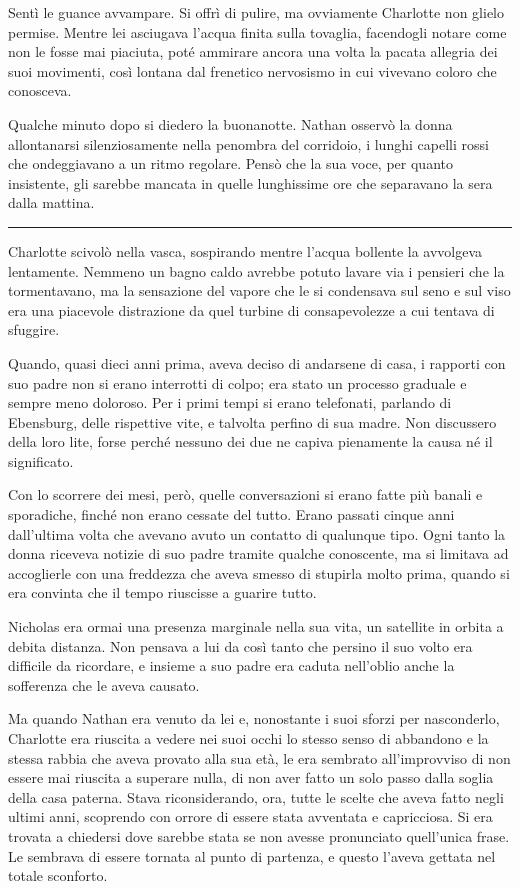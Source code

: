 \documentclass[a4paper,oneside,9pt]{memoir}
\begin{document}
Sentì le guance avvampare. Si offrì di pulire, ma ovviamente Charlotte non glielo permise. Mentre lei asciugava
l'acqua finita sulla tovaglia, facendogli notare come non le fosse mai piaciuta, poté ammirare ancora una volta la
pacata allegria dei suoi movimenti, così lontana dal frenetico nervosismo in cui vivevano coloro che conosceva.

Qualche minuto dopo si diedero la buonanotte. Nathan osservò la donna allontanarsi silenziosamente nella penombra del
corridoio, i lunghi capelli rossi che ondeggiavano a un ritmo regolare. Pensò che la sua voce, per quanto insistente,
gli sarebbe mancata in quelle lunghissime ore che separavano la sera dalla mattina.

\plainbreak{1}

Charlotte scivolò nella vasca, sospirando mentre l'acqua bollente la avvolgeva lentamente. Nemmeno un bagno caldo
avrebbe potuto lavare via i pensieri che la tormentavano, ma la sensazione del vapore che le si condensava sul seno e
sul viso era una piacevole distrazione da quel turbine di consapevolezze a cui tentava di sfuggire.

Quando, quasi dieci anni prima, aveva deciso di andarsene di casa, i rapporti con suo padre non si erano interrotti di
colpo; era stato un processo graduale e sempre meno doloroso. Per i primi tempi si erano telefonati, parlando di
Ebensburg, delle rispettive vite, e talvolta perfino di sua madre. Non discussero della loro lite, forse perché nessuno
dei due ne capiva pienamente la causa né il significato.

Con lo scorrere dei mesi, però, quelle conversazioni si erano fatte più banali e sporadiche, finché non erano cessate
del tutto. Erano passati cinque anni dall'ultima volta che avevano avuto un contatto di qualunque tipo. Ogni tanto la
donna riceveva notizie di suo padre tramite qualche conoscente, ma si limitava ad accoglierle con una freddezza che
aveva smesso di stupirla molto prima, quando si era convinta che il tempo riuscisse a guarire tutto.

Nicholas era ormai una presenza marginale nella sua vita, un satellite in orbita a debita distanza. Non pensava a lui da
così tanto che persino il suo volto era difficile da ricordare, e insieme a suo padre era caduta nell'oblio anche la
sofferenza che le aveva causato.

Ma quando Nathan era venuto da lei e, nonostante i suoi sforzi per nasconderlo, Charlotte era riuscita a vedere nei suoi
occhi lo stesso senso di abbandono e la stessa rabbia che aveva provato alla sua età, le era sembrato all'improvviso di
non essere mai riuscita a superare nulla, di non aver fatto un solo passo dalla soglia della casa paterna. Stava
riconsiderando, ora, tutte le scelte che aveva fatto negli ultimi anni, scoprendo con orrore di essere stata avventata e
capricciosa. Si era trovata a chiedersi dove sarebbe stata se non avesse pronunciato quell'unica frase. Le sembrava di
essere tornata al punto di partenza, e questo l'aveva gettata nel totale sconforto.
\end{document}
